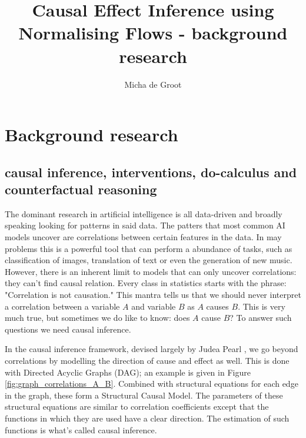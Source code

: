 \documentclass{article}
\title{Causal Effect Inference using Normalising Flows - background research}
\author{Micha de Groot}
\date
\begin{document}
\maketitle

\section{Background research}

\subsection{causal inference, interventions, do-calculus and counterfactual reasoning}
The dominant research in artificial intelligence is all data-driven and broadly speaking looking for patterns in said data. The patters that most common AI models uncover are correlations between certain features in the data. In may problems this is a powerful tool that can perform a abundance of tasks, such as classification of images, translation of text or even the generation of new music. However, there is an inherent limit to models that can only uncover correlations: they can't find causal relation. Every class in statistics starts with the phrase: "Correlation is not causation." This mantra tells us that we should never interpret a correlation between a variable $A$ and variable $B$ as $A$ causes $B$. This is very much true, but sometimes we do like to know: does $A$ cause $B$? To answer such questions we need causal inference. 

In the causal inference framework, devised largely by Judea Pearl\cite{pearl1995causal} \cite{pearl2009causal}, we go beyond correlations by modelling the direction of cause and effect as well. This is done with Directed Acyclic Graphs (DAG); an example is given in Figure \ref{fig:graph_correlations_A_B}. Combined with structural equations for each edge in the graph, these form a Structural Causal Model. The parameters of these structural equations are similar to correlation coefficients except that the functions in which they are used have a clear direction. The estimation of such functions is what's called causal inference. 
\end{document}

